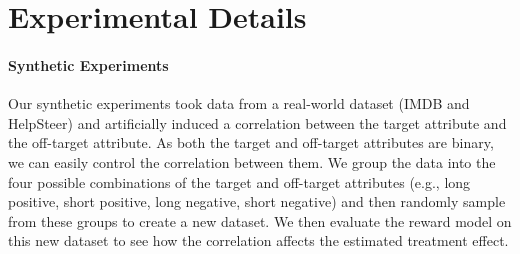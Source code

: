 \documentclass{article}
\begin{document}
\section{Experimental Details}
\label{sec:experiment-details}

\paragraph{Synthetic Experiments} 
\label{sec:synthetic-details}
Our synthetic experiments took data from a real-world dataset (IMDB and HelpSteer) and artificially induced a correlation between the target attribute and the off-target attribute. As both the target and off-target attributes are binary, we can easily control the correlation between them. We group the data into the four possible combinations of the target and off-target attributes (e.g., long positive, short positive, long negative, short negative) and then randomly sample from these groups to create a new dataset. We then evaluate the reward model on this new dataset to see how the correlation affects the estimated treatment effect.

\begin{table}[ht]
  \centering
  \small
  \caption{Adjusted counts and conditional probabilities for the synthetic experiment in , after dropping reviews whose original or rewritten text exceeds a context length of 512 tokens. Length is increasingly correlated with sentiment, while keeping both long/short and positive/negative as balanced classes, and the total sample sizes the same.}
  \label{tab:combined_table}
\end{table}
\end{document}
